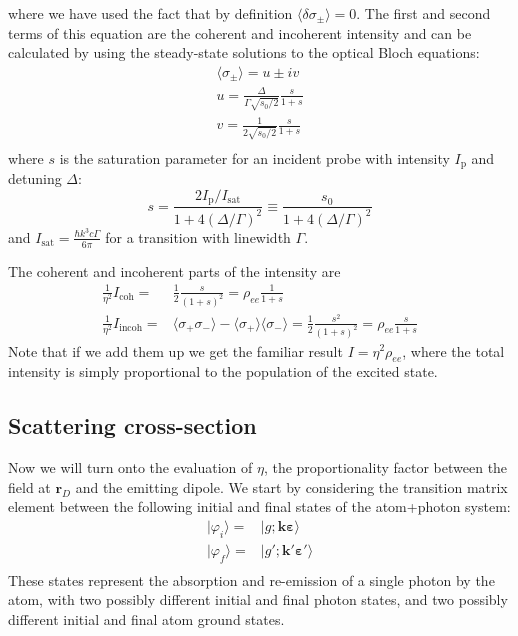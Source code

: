 \documentclass[11pt,letter]{article}
\newcommand{\bv}[1]{\ensuremath{\bm{#1}}}
\newcommand{\isat}{\ensuremath{I_{\mathrm{sat}}}}
\newcommand{\iisat}{\ensuremath{I_{\mathrm{p}}/I_{\mathrm{sat}}}}
\begin{document}
where we have used the fact that by definition $\langle \delta \sigma_{\pm}
\rangle = 0$. The first and second terms of this equation are the coherent
and incoherent intensity and can be calculated by using the
steady-state solutions to the optical Bloch equations:
\begin{gather} 
    \langle \sigma_{\pm} \rangle =  u \pm i v  \\
    u =  \frac{ \Delta }{ \Gamma  \sqrt{s_{0}/2} } 
         \frac{s}{ 1 + s } \\
    v =  \frac{ 1 } { 2 \sqrt{ s_{0}/2 } } 
         \frac{s}{1+s} \\
\end{gather}
where $s$ is the saturation parameter for an incident probe with intensity
$I_{\mathrm{p}}$ and detuning $\Delta$:
\begin{equation}
s = \frac{ 2  \iisat } { 1 + 4(\Delta/\Gamma)^{2} } 
  \equiv  \frac{ s_{0} } { 1 + 4(\Delta/\Gamma)^{2} }
\end{equation}
and $\isat = \frac{\hbar k^{3} c \Gamma }{ 6\pi} $  for a transition with
linewidth $\Gamma$. 

The coherent and incoherent parts of the intensity are
\begin{equation}
\begin{split} 
    \frac{1}{\eta^{2}}  I_{\mathrm{coh}} = &
        \frac{1}{2} \frac{s}{(1+s)^{2} } 
      = \rho_{ee}  \frac{1}{1+s} \\
    \frac{1}{\eta^{2}}  I_{\mathrm{incoh}}  = & 
        \langle \sigma_{+}\sigma_{-} \rangle - 
        \langle \sigma_{+} \rangle \langle \sigma_{-} \rangle
      = \frac{1}{2} \frac{s^{2}}{(1+s)^{2}} = \rho_{ee} \frac{s}{1+s}
 \label{eq:coh-incoh} 
\end{split}
\end{equation}
Note that if we add them up we get the familiar result
$I=\eta^{2} \rho_{ee}$, where the total intensity is simply proportional to the
population of the excited state.


\subsection{Scattering cross-section}

Now we will turn onto the evaluation of $\eta$, the proportionality factor
between the field at $\bv{r}_{D}$ and the emitting dipole. We start by
considering the transition matrix element between the following initial and
final states of the atom+photon system: 
\begin{equation}
\begin{split}
    | \varphi_{i} \rangle = & | g ; \bv{k}\bv{\varepsilon} \rangle \\
    | \varphi_{f} \rangle = & | g' ; \bv{k}'\bv{\varepsilon}' \rangle \\
\end{split}
\end{equation}
These states represent the absorption and re-emission of a single photon by the
atom, with two possibly different initial and final photon states, and two
possibly different initial and final atom ground states.
 
\end{document}
